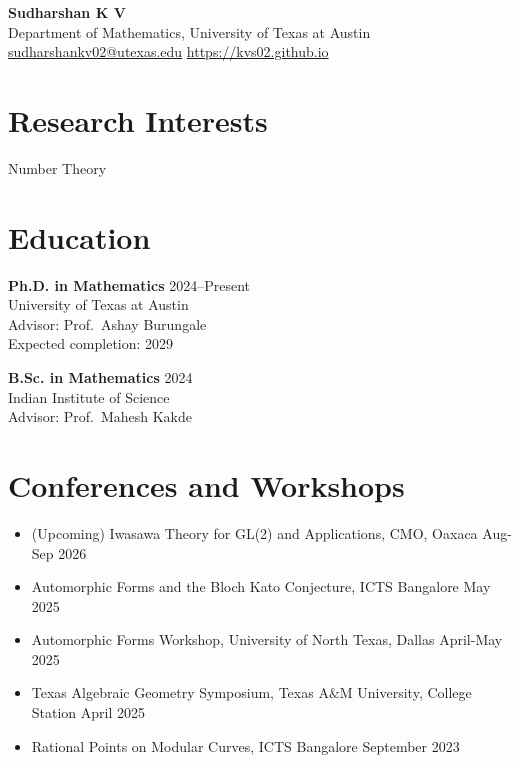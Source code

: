 \documentclass[10pt,letterpaper]{article}
\begin{document}
\begin{center}
    {\LARGE \textbf{Sudharshan K V}} \\
    \vspace{2pt}
    Department of Mathematics, University of Texas at Austin \\
    \href{mailto:sudharshankv02@utexas.edu}{sudharshankv02@utexas.edu} \quad
    \href{https://kvs02.github.io}{https://kvs02.github.io}
\end{center}

\section*{Research Interests}
Number Theory

\section*{Education}

\textbf{Ph.D. in Mathematics} \hfill 2024--Present \\
University of Texas at Austin \\
Advisor: Prof.\ Ashay Burungale \\
Expected completion: 2029 

\textbf{B.Sc. in Mathematics} \hfill 2024 \\
Indian Institute of Science \\
Advisor: Prof.\ Mahesh Kakde


\section*{Conferences and Workshops}

\begin{itemize}
  
    \item (Upcoming) Iwasawa Theory for GL(2) and Applications, CMO, Oaxaca \hfill Aug-Sep 2026
    \item Automorphic Forms and the Bloch Kato Conjecture, ICTS Bangalore \hfill May 2025
    \item Automorphic Forms Workshop, University of North Texas, Dallas \hfill April-May 2025
    \item Texas Algebraic Geometry Symposium, Texas A$\&$M University, College Station \hfill April 2025
    \item Rational Points on Modular Curves, ICTS Bangalore \hfill September 2023
\end{itemize}
\end{document}
